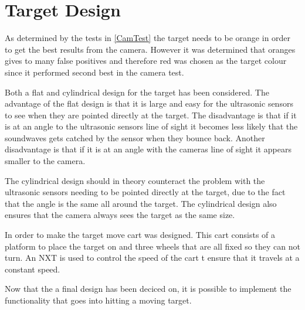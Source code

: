 \section{Target Design}
As determined by the tests in \autoref{CamTest} the target needs to be orange in
order to get the best results from the camera. However it was determined that
oranges gives to many false positives and therefore red was chosen as the target
colour since it performed second best in the camera test.\nl

Both a flat and cylindrical design for the target has been considered. The
advantage of the flat design is that it is large and easy for the ultrasonic
sensors to see when they are pointed directly at the target. The disadvantage
is that if it is at an angle to the ultrasonic sensors line of sight it 
becomes less likely that the soundwaves gets catched by the sensor when they
bounce back. Another disadvantage is that if it is at an angle with the
cameras line of sight it appears smaller to the camera.\nl

The cylindrical design should in theory counteract the problem with the
ultrasonic sensors needing to be pointed directly at the target, due to the
fact that the angle is the same all around the target. The cylindrical design
also ensures that the camera always sees the target as the same size.\nl

In order to make the target move cart was designed. This cart consists of a
platform to place the target on and three wheels that are all fixed so they can
not turn. An NXT is used to control the speed of the cart t ensure that it
travels at a constant speed.\nl

Now that the a final design has been deciced on, it is possible to implement the
functionality that goes into hitting a moving target.





